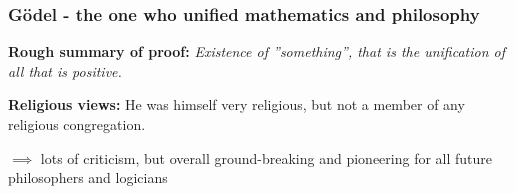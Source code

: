 \begin{frame}
    \frametitle{Gödel - the one who unified mathematics and philosophy}
    \textbf{Rough summary of proof:}
    \emph{Existence of ''something'', that is the unification of all that is positive.}
    
    \pause \textbf{Religious views:}
    He was himself very religious, but not a member of any religious congregation.

    \pause $\implies$ lots of criticism, but overall ground-breaking and pioneering for all future philosophers and logicians
\end{frame}

